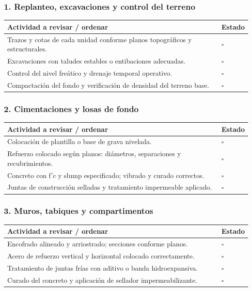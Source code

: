 \documentclass[12pt]{article}
\newcommand{\cbox}{\(\square\)}
\renewcommand{\cbox}{\(\square\)} %
\begin{document}
	\subsubsection*{1. Replanteo, excavaciones y control del terreno}
	\begin{tabularx}{\linewidth}{>{\raggedright\arraybackslash}p{0.93\linewidth} >{\centering\arraybackslash}m{0.07\linewidth}}
		\toprule
		\textbf{Actividad a revisar / ordenar} & \textbf{Estado}\\
		\midrule
		Trazos y cotas de cada unidad conforme planos topográficos y estructurales. & \cbox \\
		Excavaciones con taludes estables o entibaciones adecuadas. & \cbox \\
		Control del nivel freático y drenaje temporal operativo. & \cbox \\
		Compactación del fondo y verificación de densidad del terreno base. & \cbox \\
		\bottomrule
	\end{tabularx}
	
	\subsubsection*{2. Cimentaciones y losas de fondo}
	\begin{tabularx}{\linewidth}{>{\raggedright\arraybackslash}p{0.93\linewidth} >{\centering\arraybackslash}m{0.07\linewidth}}
		\toprule
		\textbf{Actividad a revisar / ordenar} & \textbf{Estado}\\
		\midrule
		Colocación de plantilla o base de grava nivelada. & \cbox \\
		Refuerzo colocado según planos: diámetros, separaciones y recubrimientos. & \cbox \\
		Concreto con f’c y slump especificado; vibrado y curado correctos. & \cbox \\
		Juntas de construcción selladas y tratamiento impermeable aplicado. & \cbox \\
		\bottomrule
	\end{tabularx}
	
	\subsubsection*{3. Muros, tabiques y compartimentos}
	\begin{tabularx}{\linewidth}{>{\raggedright\arraybackslash}p{0.93\linewidth} >{\centering\arraybackslash}m{0.07\linewidth}}
		\toprule
		\textbf{Actividad a revisar / ordenar} & \textbf{Estado}\\
		\midrule
		Encofrado alineado y arriostrado; secciones conforme planos. & \cbox \\
		Acero de refuerzo vertical y horizontal colocado correctamente. & \cbox \\
		Tratamiento de juntas frías con aditivo o banda hidroexpansiva. & \cbox \\
		Curado del concreto y aplicación de sellador impermeabilizante. & \cbox \\
		\bottomrule
	\end{tabularx}
	
\end{document}
